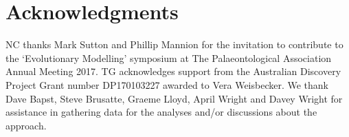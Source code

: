 \documentclass[12pt,a4paper]{article}
\begin{document}
\section{Acknowledgments}
	NC thanks Mark Sutton and Phillip Mannion for the invitation to contribute to the `Evolutionary Modelling' symposium at The Palaeontological Association Annual Meeting 2017.
  TG acknowledges support from the Australian Discovery Project Grant number DP170103227 awarded to Vera Weisbecker.
  We thank Dave Bapst, Steve Brusatte, Graeme Lloyd, April Wright and Davey Wright for assistance in gathering data for the analyses and/or discussions about the approach.
	
 
 
\end{document}

